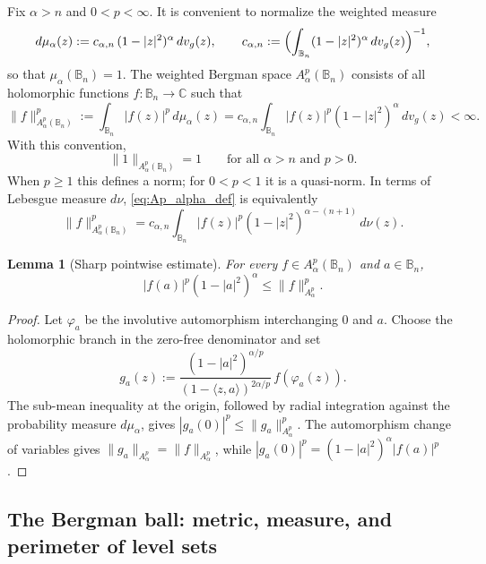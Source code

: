 \documentclass[11pt]{amsart}
\theoremstyle{plain}
\newtheorem{lemma}[theorem]{Lemma}
\theoremstyle{definition}
\theoremstyle{remark}
\newcommand{\B}{\mathbb{B}}
\newcommand{\C}{\mathbb{C}}
\begin{document}
Fix $\alpha>n$ and $0<p<\infty$. It is convenient to normalize the weighted
measure
\begin{equation*}\label{eq:weighted_prob_measure}
d\mu_\alpha(z):=c_{\alpha,n}\,(1-|z|^2)^{\alpha}\,dv_g(z),
\qquad
c_{\alpha,n}:=\Bigl(\int_{\B_n}(1-|z|^2)^{\alpha}\,dv_g(z)\Bigr)^{-1},
\end{equation*}
so that $\mu_\alpha(\B_n)=1$. The weighted Bergman space $A_\alpha^p(\B_n)$
consists of all holomorphic functions $f:\B_n\to\C$ such that
\begin{equation}\label{eq:Ap_alpha_def}
\|f\|_{A_\alpha^p(\B_n)}^p
:=
\int_{\B_n} |f(z)|^p\,d\mu_\alpha(z)
=
c_{\alpha,n}\int_{\B_n} |f(z)|^p (1-|z|^2)^\alpha\,dv_g(z)
<\infty.
\end{equation}
With this convention,
\begin{equation*}\label{eq:norm_one_is_one}
\|1\|_{A_\alpha^p(\B_n)}=1 \qquad\text{for all }\alpha>n \text{ and } p>0.
\end{equation*}
When $p\ge1$ this defines a norm; for $0<p<1$ it is a quasi-norm. In terms of
Lebesgue measure $d\nu$, \eqref{eq:Ap_alpha_def} is equivalently
\begin{equation*}\label{eq:Ap_alpha_dnu_equiv}
\|f\|_{A_\alpha^p(\B_n)}^p
=
c_{\alpha,n}\int_{\B_n} |f(z)|^p (1-|z|^2)^{\alpha-(n+1)}\,d\nu(z).
\end{equation*}

\begin{lemma}[Sharp pointwise estimate]\label{lem:sharp_pointwise}
For every $f\in A_\alpha^p(\B_n)$ and $a\in\B_n$,
\begin{equation}\label{eq:sharp_pointwise_bound}
 |f(a)|^p(1-|a|^2)^\alpha\le \|f\|_{A^p_\alpha}^p.
\end{equation}
\end{lemma}

\begin{proof}
Let $\varphi_a$ be the involutive automorphism interchanging $0$ and $a$.
Choose the holomorphic branch in the zero-free denominator and set
\[
 g_a(z):=\frac{(1-|a|^2)^{\alpha/p}}
 {(1-\langle z,a\rangle)^{2\alpha/p}}\,f(\varphi_a(z)).
\]
The sub-mean inequality at the origin, followed by radial integration against
the probability measure $d\mu_\alpha$, gives
$|g_a(0)|^p\le\|g_a\|_{A^p_\alpha}^p$. The automorphism change of variables
gives $\|g_a\|_{A^p_\alpha}=\|f\|_{A^p_\alpha}$, while
$|g_a(0)|^p=(1-|a|^2)^\alpha|f(a)|^p$.
\end{proof}


\subsection{The Bergman ball: metric, measure, and perimeter of level sets}
\end{document}
